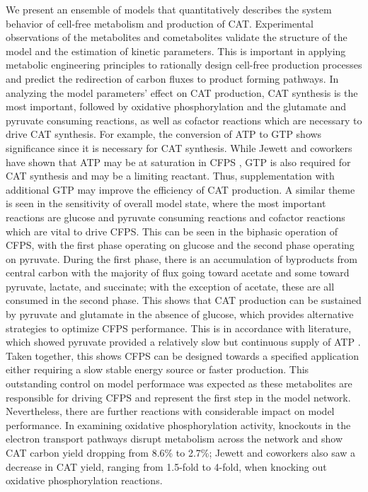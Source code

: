 \documentclass[12pt]{article}
\begin{document}
We present an ensemble of models that quantitatively describes the system behavior of cell-free metabolism and production of CAT.
Experimental observations of the metabolites and cometabolites validate the structure of the model and the estimation of kinetic parameters.
This is important in applying metabolic engineering principles to rationally design cell-free production processes and predict the redirection of carbon fluxes to product forming pathways.
In analyzing the model parameters' effect on CAT production, CAT synthesis is the most important, followed by oxidative phosphorylation and the glutamate and pyruvate consuming reactions, as well as cofactor reactions which are necessary to drive CAT synthesis.
For example, the conversion of ATP to GTP shows significance since it is necessary for CAT synthesis.
While Jewett and coworkers have shown that ATP may be at saturation in CFPS \cite{Jewett:2008aa}, GTP is also required for CAT synthesis and may be a limiting reactant.
Thus, supplementation with additional GTP may improve the efficiency of CAT production.
A similar theme is seen in the sensitivity of overall model state, where the most important reactions are glucose and pyruvate consuming reactions and cofactor reactions which are vital to drive CFPS.
This can be seen in the biphasic operation of CFPS, with the first phase operating on glucose and the second phase operating on pyruvate.
During the first phase, there is an accumulation of byproducts from central carbon with the majority of flux going toward acetate and some toward pyruvate, lactate, and succinate; with the exception of acetate, these are all consumed in the second phase.
This shows that CAT production can be sustained by pyruvate and glutamate in the absence of glucose, which provides alternative strategies to optimize CFPS performance.
This is in accordance with literature, which showed pyruvate provided a relatively slow but continuous supply of ATP \cite{swartz_nature2001}.
Taken together, this shows CFPS can be designed towards a specified application either requiring a slow stable energy source or faster production.
This outstanding control on model performace was expected as these metabolites are responsible for driving CFPS and represent the first step in the model network.
Nevertheless, there are further reactions with considerable impact on model performance.
In examining oxidative phosphorylation activity, knockouts in the electron transport pathways disrupt metabolism across the network and show CAT carbon yield dropping from 8.6\% to 2.7\%; Jewett and coworkers also saw a decrease in CAT yield, ranging from 1.5-fold to 4-fold, when knocking out oxidative phosphorylation reactions\cite{Jewett:2008aa}.
\end{document}
